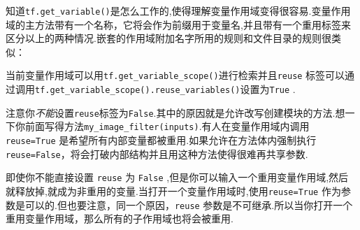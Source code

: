 知道\texttt{tf.get\_variable()}是怎么工作的,使得理解变量作用域变得很容易.变量作用域的主方法带有一个名称，它将会作为前缀用于变量名,并且带有一个重用标签来区分以上的两种情况.嵌套的作用域附加名字所用的规则和文件目录的规则很类似：

\begin{Shaded}
\begin{Highlighting}[]
 \NormalTok{):}
     \NormalTok{):}
        \OperatorTok{=} \NormalTok{, [}\NormalTok{])}
 \OperatorTok{==} 
\end{Highlighting}
\end{Shaded}

当前变量作用域可以用\texttt{tf.get\_variable\_scope()}进行检索并且\texttt{reuse}
标签可以通过调用\texttt{tf.get\_variable\_scope().reuse\_variables()}设置为\texttt{True}
.

\begin{Shaded}
\begin{Highlighting}[]
 \NormalTok{):}
    \OperatorTok{=} \NormalTok{, [}\NormalTok{])}
    \OperatorTok{=} \NormalTok{, [}\NormalTok{])}
 \OperatorTok{==} 
\end{Highlighting}
\end{Shaded}

注意你\emph{不能}设置\texttt{reuse}标签为\texttt{False}.其中的原因就是允许改写创建模块的方法.想一下你前面写得方法\texttt{my\_image\_filter(inputs)}.有人在变量作用域内调用\texttt{reuse=True}
是希望所有内部变量都被重用.如果允许在方法体内强制执行\texttt{reuse=False}，将会打破内部结构并且用这种方法使得很难再共享参数.

即使你不能直接设置 \texttt{reuse} 为 \texttt{False}
,但是你可以输入一个重用变量作用域,然后就释放掉,就成为非重用的变量.当打开一个变量作用域时,使用\texttt{reuse=True}
作为参数是可以的.但也要注意，同一个原因，\texttt{reuse}
参数是不可继承.所以当你打开一个重用变量作用域，那么所有的子作用域也将会被重用.

